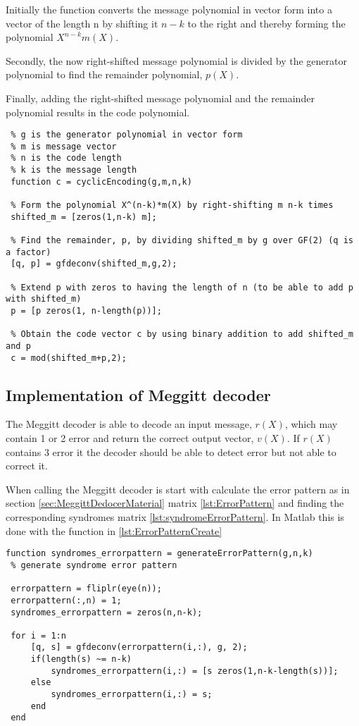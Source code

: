 \documentclass[Main]{subfiles}
\begin{document}
\noindent Initially the function converts the message polynomial in vector form into a vector of the length n by shifting it $n-k$ to the right and thereby forming the polynomial $X^{n-k}m(X)$. 

\noindent Secondly, the now right-shifted message polynomial is divided by the generator polynomial to find the remainder polynomial, $p(X)$.

\noindent Finally, adding the right-shifted message polynomial and the remainder polynomial results in the code polynomial.  

\begin{lstlisting}[caption=Cyclic Encoder, style=Code-Matlab, label=lst:refID]
 % cyclicEncoding is a function that encodes a message vector into systematic code given the following parameters
 % g is the generator polynomial in vector form
 % m is message vector
 % n is the code length
 % k is the message length
 function c = cyclicEncoding(g,m,n,k)

 % Form the polynomial X^(n-k)*m(X) by right-shifting m n-k times 
 shifted_m = [zeros(1,n-k) m];

 % Find the remainder, p, by dividing shifted_m by g over GF(2) (q is a factor)
 [q, p] = gfdeconv(shifted_m,g,2);

 % Extend p with zeros to having the length of n (to be able to add p with shifted_m)
 p = [p zeros(1, n-length(p))];

 % Obtain the code vector c by using binary addition to add shifted_m and p 
 c = mod(shifted_m+p,2);
\end{lstlisting}

\subsection{Implementation of Meggitt decoder}
The Meggitt decoder is able to decode an input message, $r(X)$, which may contain 1 or 2 error and return the correct output vector, $v(X)$.
If $r(X)$ contains 3 error it the decoder should be able to detect error but not able to correct it.

When calling the Meggitt decoder is start with calculate the error pattern as in section \ref{sec:MeggittDedocerMaterial} matrix \ref{lst:ErrorPattern} and finding the corresponding syndromes matrix \ref{lst:syndromeErrorPattern}.
In Matlab this is done with the function in \codeTitle \ref{lst:ErrorPatternCreate}

\begin{lstlisting}[caption=Error pattern creation, style=Code-Matlab, label=lst:ErrorPatternCreate]
 function syndromes_errorpattern = generateErrorPattern(g,n,k)
 % generate syndrome error pattern
 
 errorpattern = fliplr(eye(n));
 errorpattern(:,n) = 1;
 syndromes_errorpattern = zeros(n,n-k);
 
 for i = 1:n
     [q, s] = gfdeconv(errorpattern(i,:), g, 2);
     if(length(s) ~= n-k)
         syndromes_errorpattern(i,:) = [s zeros(1,n-k-length(s))];
     else
         syndromes_errorpattern(i,:) = s;
     end
 end
\end{lstlisting}
\end{document}
